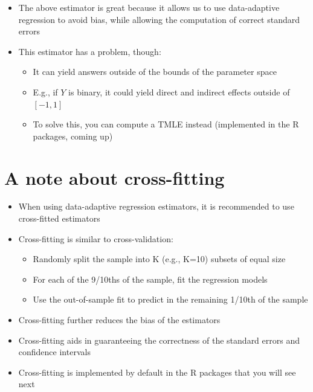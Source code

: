 \documentclass[
  12pt,
]{book}
\providecommand{\tightlist}{%
  \setlength{\itemsep}{0pt}\setlength{\parskip}{0pt}}
\theoremstyle{definition}
\theoremstyle{definition}
\theoremstyle{definition}
\newcommand{\1}{\mathbbm{1}}
\begin{document}
\begin{itemize}
\tightlist
\item
  The above estimator is great because it allows us to use data-adaptive
  regression to avoid bias, while allowing the computation of correct standard
  errors
\item
  This estimator has a problem, though:

  \begin{itemize}
  \tightlist
  \item
    It can yield answers outside of the bounds of the parameter space
  \item
    E.g., if \(Y\) is binary, it could yield direct and indirect effects outside
    of \([-1,1]\)
  \item
    To solve this, you can compute a TMLE instead (implemented in the R
    packages, coming up)
  \end{itemize}
\end{itemize}

\hypertarget{a-note-about-cross-fitting}{%
\section{A note about cross-fitting}\label{a-note-about-cross-fitting}}

\begin{itemize}
\tightlist
\item
  When using data-adaptive regression estimators, it is recommended to use
  cross-fitted estimators
\item
  Cross-fitting is similar to cross-validation:

  \begin{itemize}
  \tightlist
  \item
    Randomly split the sample into K (e.g., K=10) subsets of equal size
  \item
    For each of the 9/10ths of the sample, fit the regression models
  \item
    Use the out-of-sample fit to predict in the remaining 1/10th of the sample
  \end{itemize}
\item
  Cross-fitting further reduces the bias of the estimators
\item
  Cross-fitting aids in guaranteeing the correctness of the standard errors and
  confidence intervals
\item
  Cross-fitting is implemented by default in the R packages that you will see
  next
\end{itemize}
\end{document}
